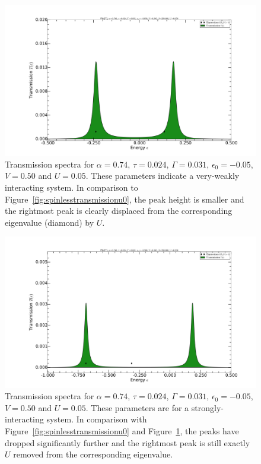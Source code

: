 \begin{figure}[h]
    \centering
    \includegraphics[height=.35\textheight,clip=true,trim=7cm 2cm 7cm 4cm]{pdf/trans/decospinlesstransmissionarbitraryu1.pdf}
    \caption{Transmission spectra for $\alpha=0.74$, $\tau=0.024$, $\Gamma=0.031$, $\epsilon_0 = - 0.05$, $V=0.50$ and $U=0.05$. These parameters indicate a very-weakly interacting system. In comparison to Figure~\ref{fig:spinlesstransmissionu0}, the peak height is smaller and the rightmost peak is clearly displaced from the corresponding eigenvalue (diamond) by $U$. }
    \label{fig:spinlesstransmissionu1}
\end{figure}
\begin{figure}[h]
    \centering
    \includegraphics[height=.35\textheight,clip=true,trim=7cm 2cm 7cm 4cm]{pdf/trans/decospinlesstransmissionarbitraryu4.pdf}
    \caption{Transmission spectra for $\alpha=0.74$, $\tau=0.024$, $\Gamma=0.031$, $\epsilon_0 = - 0.05$, $V=0.50$ and $U=0.05$. These parameters are for a strongly-interacting system. In comparison with Figure~\ref{fig:spinlesstransmissionu0} and Figure~\ref{fig:spinlesstransmissionu1}, the peaks have dropped significantly further and the rightmost peak is still exactly $U$ removed from the corresponding eigenvalue.}
    \label{fig:spinlesstransmissionu4}
\end{figure}

